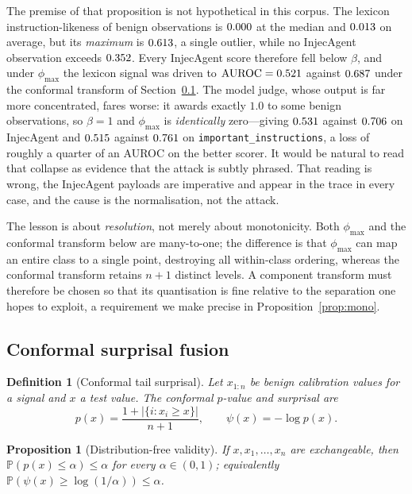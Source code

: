 \documentclass[pdflatex,sn-basic]{sn-jnl}%
\theoremstyle{thmstyleone}
\newtheorem{proposition}[theorem]{Proposition}
\theoremstyle{thmstyletwo}
\theoremstyle{thmstylethree}
\newtheorem{definition}{Definition}
\newcommand{\Prob}{\mathbb{P}}
\begin{document}
The premise of that proposition is not hypothetical in this corpus. The lexicon
instruction-likeness of benign observations is $0.000$ at the median and
$0.013$ on average,
but its \emph{maximum} is $0.613$, a single outlier, while no InjecAgent
observation exceeds $0.352$. Every InjecAgent score therefore fell below
$\beta$, and under $\phi_{\max}$ the lexicon signal was driven to
$\mathrm{AUROC} = 0.521$ against $0.687$ under the conformal
transform of Section~\ref{sec:fusion}. The model judge, whose output is far more
concentrated, fares worse: it awards exactly $1.0$ to some benign observations, so
$\beta = 1$ and $\phi_{\max}$ is \emph{identically} zero---giving
$0.531$ against $0.706$ on InjecAgent and
$0.515$ against $0.761$ on
\texttt{important\_instructions}, a loss of roughly a quarter of an AUROC on the
better scorer. It would be natural to read that collapse as evidence that the
attack is subtly phrased. That reading is wrong, the InjecAgent payloads are
imperative and appear in the trace in every case, and the cause is the
normalisation, not the attack.

The lesson is about \emph{resolution}, not merely about monotonicity. Both
$\phi_{\max}$ and the conformal transform below are many-to-one; the difference is
that $\phi_{\max}$ can map an entire class to a single point, destroying all
within-class ordering, whereas the conformal transform retains $n+1$ distinct
levels. A component transform must therefore be chosen so that its quantisation
is fine relative to the separation one hopes to exploit, a requirement we make
precise in Proposition~\ref{prop:mono}.

\subsection{Conformal surprisal fusion}\label{sec:fusion}

\begin{definition}[Conformal tail surprisal]
Let $x_{1:n}$ be benign calibration values for a signal and $x$ a test value. The
conformal $p$-value and surprisal are
\begin{equation}\label{eq:conformal}
p(x) = \frac{1 + |\{i : x_i \ge x\}|}{n+1},
\qquad
\psi(x) = -\log p(x).
\end{equation}
\end{definition}

\begin{proposition}[Distribution-free validity]\label{prop:valid}
If $x, x_1, \dots, x_n$ are exchangeable, then $\Prob(p(x) \le \alpha) \le \alpha$
for every $\alpha \in (0,1)$; equivalently
$\Prob(\psi(x) \ge \log(1/\alpha)) \le \alpha$.
\end{proposition}
\end{document}
